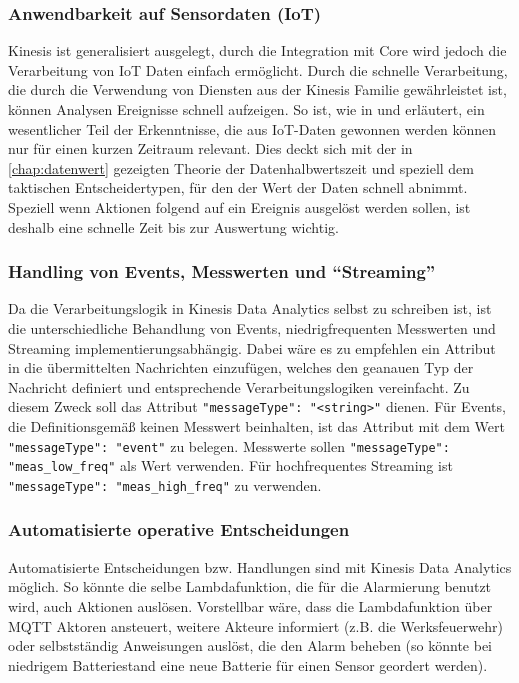 \subsubsection{Anwendbarkeit auf Sensordaten (IoT)}
Kinesis ist generalisiert ausgelegt, durch die Integration mit \AWSIOT{} Core wird jedoch die Verarbeitung von \ac{IoT} Daten einfach ermöglicht. Durch die schnelle Verarbeitung, die durch die Verwendung von Diensten aus der Kinesis Familie gewährleistet ist, können Analysen Ereignisse schnell aufzeigen. So ist, wie in  und  erläutert, ein wesentlicher Teil der Erkenntnisse, die aus \ac{IoT}-Daten gewonnen werden können nur für einen kurzen Zeitraum relevant. Dies deckt sich mit der in \autoref{chap:datenwert} gezeigten Theorie der Datenhalbwertszeit und speziell dem taktischen Entscheidertypen, für den der Wert der Daten schnell abnimmt. Speziell wenn Aktionen folgend auf ein Ereignis ausgelöst werden sollen, ist deshalb eine schnelle Zeit bis zur Auswertung wichtig.

\subsubsection{Handling von Events, Messwerten und \enquote{Streaming}}
Da die Verarbeitungslogik in Kinesis Data Analytics selbst zu schreiben ist, ist die unterschiedliche Behandlung von Events, niedrigfrequenten Messwerten und Streaming implementierungsabhängig. Dabei wäre es zu empfehlen ein Attribut in die übermittelten Nachrichten einzufügen, welches den geanauen Typ der Nachricht definiert und entsprechende Verarbeitungslogiken vereinfacht. Zu diesem Zweck soll das Attribut \texttt{{"messageType": "<string>"}} dienen. Für Events, die Definitionsgemäß keinen Messwert beinhalten, ist das Attribut mit dem Wert \texttt{{"messageType": "event"}} zu belegen. Messwerte sollen \texttt{{"messageType": "meas_low_freq"}} als Wert verwenden. Für hochfrequentes Streaming ist \texttt{{"messageType": "meas_high_freq"}} zu verwenden.

\subsubsection{Automatisierte operative Entscheidungen}
Automatisierte Entscheidungen bzw. Handlungen sind mit Kinesis Data Analytics möglich. So könnte die selbe Lambdafunktion, die für die Alarmierung benutzt wird, auch Aktionen auslösen. Vorstellbar wäre, dass die Lambdafunktion über \ac{MQTT} Aktoren ansteuert, weitere Akteure informiert (z.B. die Werksfeuerwehr) oder selbstständig Anweisungen auslöst, die den Alarm beheben (so könnte bei niedrigem Batteriestand eine neue Batterie für einen Sensor geordert werden). 


